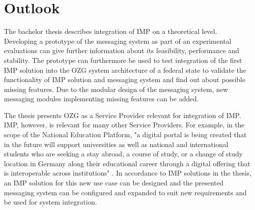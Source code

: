\section{Outlook}

The bachelor thesis describes integration of IMP on a theoretical level. Developing a prototype of the messaging system as part of an experimental evaluations can give further information about its feasibility, performance and stability. The prototype can furthermore be used to test integration of the first IMP solution into the OZG system architecture of a federal state to validate the functionality of IMP solution and messaging system and find out about possible missing features. Due to the modular design of the messaging system, new messaging modules implementing missing features can be added.

The thesis presents OZG as a Service Provider relevant for integration of IMP. IMP, however, is relevant for many other Service Providers. For example, in the scope of the National Education Platform, "a digital portal is being created that in the future will support universities as well as national and international students who are seeking a stay abroad, a course of study, or a change of study location in Germany along their educational career through a digital offering that is interoperable across institutions" \cite{digitale_bildung}. In accordance to IMP solutions in the thesis, an IMP solution for this new use case can be designed and the presented messaging system can be configured and expanded to suit new requirements and be used for system integration. 

